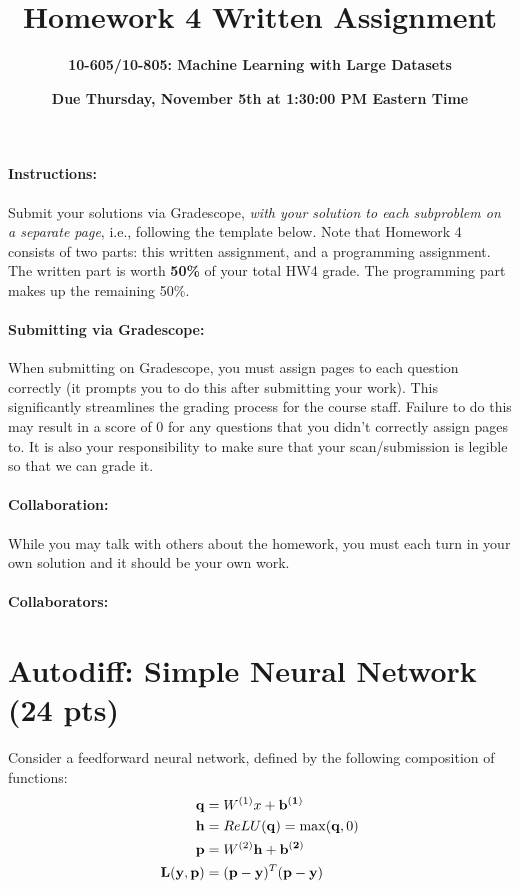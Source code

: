 \documentclass{exam}
\begin{document}
\title{Homework 4 Written Assignment}
\author{\Large \bf 10-605/10-805: Machine Learning with Large Datasets}
\date{{\bf Due Thursday, November 5th at 1:30:00 PM Eastern Time}}
\maketitle

\paragraph{Instructions:} Submit your solutions via Gradescope, \textit{with your solution to each subproblem on a separate page}, i.e., following the template below.  Note that Homework 4 consists of two parts: this written assignment, and a programming assignment. The written part is worth \textbf{50\%} of your total HW4 grade. The programming part makes up the remaining 50\%.

\paragraph{Submitting via Gradescope:} When submitting on Gradescope, you must assign pages to each question correctly (it
prompts you to do this after submitting your work). This significantly streamlines the
grading process for the course staff.  Failure to do this may result in a score of 0 for any questions
that you didn't correctly assign pages to. It is also your responsibility to make sure that your scan/submission is legible so that we can grade it.

\paragraph{Collaboration:}  While you may talk with others about the homework, you must each turn in your own solution and it should be your own work. 

\paragraph{Collaborators:}


\newpage

\section{Autodiff: Simple Neural Network (24 pts)}
Consider a feedforward neural network, defined by the following composition of functions:
\begin{align}
    \bold{q} &= W^{(1)}x + \bold{b^{(1)}} \\
    \bold{h} &= ReLU(\bold{q}) = \max(\bold{q}, 0) \\
    \bold{p} &= W^{(2)}\bold{h} + \bold{b^{(2)}} \\ 
    \bold{L}(\bold{y}, \bold{p}) &= (\bold{p} - \bold{y})^T(\bold{p} - \bold{y}) 
\end{align}
\end{document}
